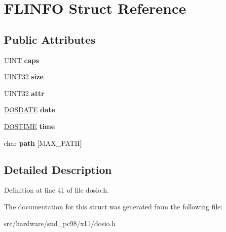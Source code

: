 \hypertarget{structFLINFO}{\section{F\-L\-I\-N\-F\-O Struct Reference}
\label{structFLINFO}
}
\subsection*{Public Attributes}
\begin{DoxyCompactItemize}
\item 
\hypertarget{structFLINFO_a22b1f86529d724b717035edba8cfe271}{U\-I\-N\-T {\bfseries caps}}\label{structFLINFO_a22b1f86529d724b717035edba8cfe271}

\item 
\hypertarget{structFLINFO_a703310344a0ceae5a0274025f4438b8e}{U\-I\-N\-T32 {\bfseries size}}\label{structFLINFO_a703310344a0ceae5a0274025f4438b8e}

\item 
\hypertarget{structFLINFO_ac63faed2594644e2cdee6617a869c138}{U\-I\-N\-T32 {\bfseries attr}}\label{structFLINFO_ac63faed2594644e2cdee6617a869c138}

\item 
\hypertarget{structFLINFO_a65214b31063f4ec847a0d17f6d65f2c2}{\hyperlink{structDOSDATE}{D\-O\-S\-D\-A\-T\-E} {\bfseries date}}\label{structFLINFO_a65214b31063f4ec847a0d17f6d65f2c2}

\item 
\hypertarget{structFLINFO_ae9e4a4b13cd8df917985b547c0c23906}{\hyperlink{structDOSTIME}{D\-O\-S\-T\-I\-M\-E} {\bfseries time}}\label{structFLINFO_ae9e4a4b13cd8df917985b547c0c23906}

\item 
\hypertarget{structFLINFO_a3cd40b902de9973dfbb498cafdeaff4e}{char {\bfseries path} \mbox{[}M\-A\-X\-\_\-\-P\-A\-T\-H\mbox{]}}\label{structFLINFO_a3cd40b902de9973dfbb498cafdeaff4e}

\end{DoxyCompactItemize}


\subsection{Detailed Description}


Definition at line 41 of file dosio.\-h.



The documentation for this struct was generated from the following file\-:\begin{DoxyCompactItemize}
\item 
src/hardware/snd\-\_\-pc98/x11/dosio.\-h\end{DoxyCompactItemize}
